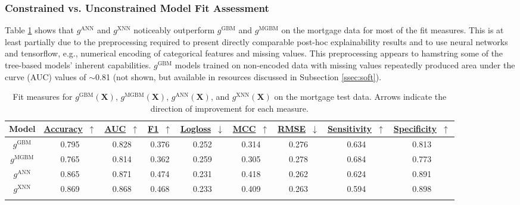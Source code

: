 \documentclass[information,article,submit,moreauthors,pdftex]{definitions/mdpi}
\begin{document}
\subsubsection{Constrained vs. Unconstrained Model Fit Assessment}\label{ssec:c_v_uc_mort}

Table \ref{tab:mort_acc} shows that $g^\text{ANN}$ and $g^\text{XNN}$ noticeably outperform $g^\text{GBM}$ and $g^\text{MGBM}$ on the mortgage data for most of the fit measures. This is at least partially due to the preprocessing required to present directly comparable post-hoc explainability results and to use neural networks and tensorflow, e.g., numerical encoding of categorical features and missing values. This preprocessing appears to hamstring some of the tree-based models' inherent capabilities. $g^\text{GBM}$ models trained on non-encoded data with missing values repeatedly produced area under the curve (AUC) values of $\sim$0.81 (not shown, but available in resources discussed in Subsection \ref{ssec:soft}). 

\begin{table}[htb]
	\caption{Fit measures for $g^\text{GBM}(\mathbf{X})$, $g^\text{MGBM}(\mathbf{X})$, $g^\text{ANN}(\mathbf{X})$, and $g^\text{XNN}(\mathbf{X})$ on the mortgage test data. Arrows indicate the direction of improvement for each measure.}
\centering
\begin{tabular}{ccccccccc}
	\toprule
	\textbf{Model} & 
	\href{https://scikit-learn.org/stable/modules/model_evaluation.html#accuracy-score}{\textbf{Accuracy}}~$\uparrow$ & \href{https://en.wikipedia.org/wiki/Receiver_operating_characteristic#Area_under_the_curve}{\textbf{AUC}}~$\uparrow$ & \href{https://en.wikipedia.org/wiki/F1_score}{\textbf{F1}}~$\uparrow$ & 
	\href{https://scikit-learn.org/stable/modules/model_evaluation.html#log-loss}{\textbf{Logloss}}~$\downarrow$ & \href{https://en.wikipedia.org/wiki/Matthews_correlation_coefficient}{\textbf{MCC}}~$\uparrow$ & \href{https://en.wikipedia.org/wiki/Root-mean-square_deviation}{\textbf{RMSE}}~$\downarrow$ & \href{https://en.wikipedia.org/wiki/Sensitivity_and_specificity}{\textbf{Sensitivity}}~$\uparrow$ & \href{https://en.wikipedia.org/wiki/Sensitivity_and_specificity}{\textbf{Specificity}}~$\uparrow$ \\
	\midrule	
$g^\text{GBM}$		& 0.795	& 0.828	& 0.376 & 0.252 & 0.314 & 0.276 & 0.634 & 0.813 \\
$g^\text{MGBM}$	& 0.765	& 0.814	& 0.362 & 0.259 & 0.305 & 0.278 & 0.684 & 0.773 \\
$g^\text{ANN}$		& 0.865	& 0.871	& 0.474 & 0.231 & 0.418 & 0.262 & 0.624 & 0.891 \\
$g^\text{XNN}$		& 0.869	& 0.868	& 0.468 & 0.233 & 0.409 & 0.263 & 0.594 & 0.898 \\
\bottomrule
\label{tab:mort_acc}
\end{tabular}
\end{table}
\end{document}

